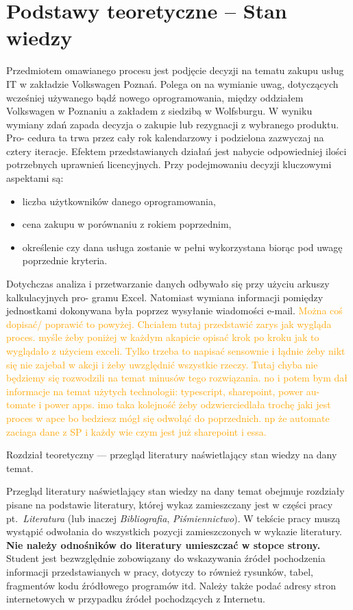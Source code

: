 
\chapter{Podstawy teoretyczne -- Stan wiedzy}

Przedmiotem omawianego procesu jest podjęcie decyzji na tematu zakupu usług IT w zakładzie
Volkswagen Poznań. Polega on na wymianie uwag, dotyczących wcześniej używanego bądź nowego
oprogramowania, między oddziałem Volkswagen w Poznaniu a zakładem z siedzibą w Wolfsburgu.
W wyniku wymiany zdań zapada decyzja o zakupie lub rezygnacji z wybranego produktu. Pro-
cedura ta trwa przez cały rok kalendarzowy i podzielona zazwyczaj na cztery iteracje. Efektem
przedstawianych działań jest nabycie odpowiedniej ilości potrzebnych uprawnień licencyjnych. Przy
podejmowaniu decyzji kluczowymi aspektami są:
\begin{itemize}
    \item liczba użytkowników danego oprogramowania,
    \item cena zakupu w porównaniu z rokiem poprzednim,
    \item określenie czy dana usługa zostanie w pełni wykorzystana biorąc pod uwagę poprzednie
kryteria.
\end{itemize}
Dotychczas analiza i przetwarzanie danych odbywało się przy użyciu arkuszy kalkulacyjnych pro-
gramu Excel. Natomiast wymiana informacji pomiędzy jednostkami dokonywana była poprzez
wysyłanie wiadomości e-mail.
\newline\textcolor{orange}{
Można coś dopisać/ poprawić to powyżej. Chciałem tutaj przedstawić zarys jak wygląda proces.
myśle żeby poniżej w każdym akapicie opisać krok po kroku jak to wyglądało z użyciem exceli.
Tylko trzeba to napisać sensownie i łądnie żeby nikt się nie zajebał w akcji i żeby uwzględnić
wszystkie rzeczy. Tutaj chyba nie będziemy się rozwodzili na temat minusów tego rozwiązania.
no i potem bym dał informacje na temat użytych technologii: typescript, sharepoint, power au-
tomate i power apps. imo taka kolejność żeby odzwierciedlała trochę jaki jest proces w apce bo
bedziesz mógł się odwołąć do poprzednich. np że automate zaciaga dane z SP i każdy wie czym
jest już sharepoint i essa.}
\vspace{5cm}
\par Rozdział teoretyczny --- przegląd literatury naświetlający stan wiedzy na dany temat. 

Przegląd literatury naświetlający stan wiedzy na dany temat obejmuje rozdziały pisane na podstawie
literatury, której wykaz zamieszczany jest w części pracy pt.~\emph{Literatura} (lub inaczej \emph{Bibliografia},
\emph{Piśmiennictwo}). W tekście pracy muszą wystąpić odwołania do wszystkich pozycji zamieszczonych w
wykazie literatury. \textbf{Nie należy odnośników do literatury umieszczać w stopce strony.} Student jest
bezwzględnie zobowiązany do wskazywania źródeł pochodzenia informacji przedstawianych w pracy,
dotyczy to również rysunków, tabel, fragmentów kodu źródłowego programów itd. Należy także podać
adresy stron internetowych w przypadku źródeł pochodzących z Internetu.



